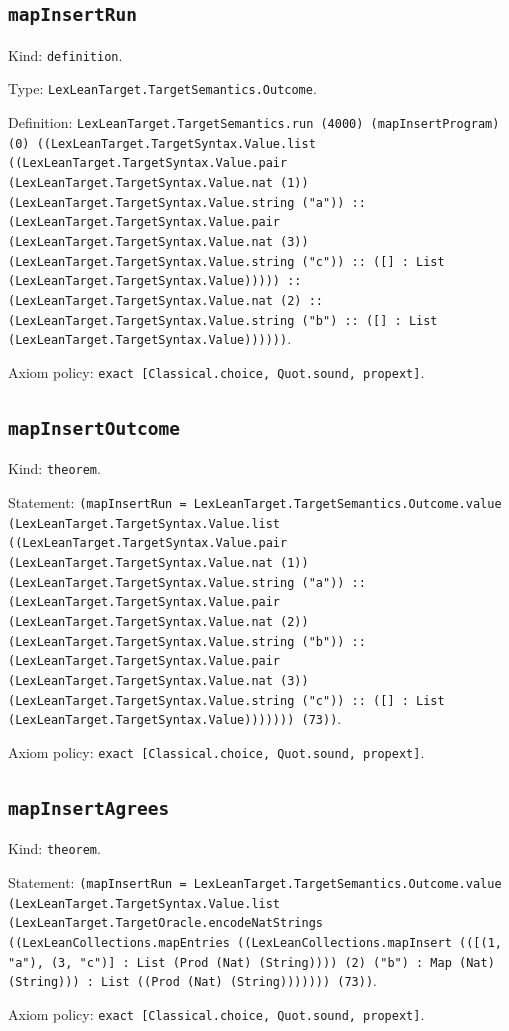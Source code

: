 \documentclass[11pt]{article}
\begin{document}
\subsection*{\texttt{mapInsertRun}}
\noindent Kind: \texttt{definition}.\par
\noindent Type: \texttt{LexLeanTarget.TargetSemantics.Outcome}.\par
\noindent Definition: \texttt{LexLeanTarget.TargetSemantics.run (4000) (mapInsertProgram) (0) ((LexLeanTarget.TargetSyntax.Value.list ((LexLeanTarget.TargetSyntax.Value.pair (LexLeanTarget.TargetSyntax.Value.nat (1)) (LexLeanTarget.TargetSyntax.Value.string ("a")) :: (LexLeanTarget.TargetSyntax.Value.pair (LexLeanTarget.TargetSyntax.Value.nat (3)) (LexLeanTarget.TargetSyntax.Value.string ("c")) :: ([] : List (LexLeanTarget.TargetSyntax.Value))))) :: (LexLeanTarget.TargetSyntax.Value.nat (2) :: (LexLeanTarget.TargetSyntax.Value.string ("b") :: ([] : List (LexLeanTarget.TargetSyntax.Value))))))}.\par
\noindent Axiom policy: \texttt{exact [Classical.choice, Quot.sound, propext]}.\par
\subsection*{\texttt{mapInsertOutcome}}
\noindent Kind: \texttt{theorem}.\par
\noindent Statement: \texttt{(mapInsertRun = LexLeanTarget.TargetSemantics.Outcome.value (LexLeanTarget.TargetSyntax.Value.list ((LexLeanTarget.TargetSyntax.Value.pair (LexLeanTarget.TargetSyntax.Value.nat (1)) (LexLeanTarget.TargetSyntax.Value.string ("a")) :: (LexLeanTarget.TargetSyntax.Value.pair (LexLeanTarget.TargetSyntax.Value.nat (2)) (LexLeanTarget.TargetSyntax.Value.string ("b")) :: (LexLeanTarget.TargetSyntax.Value.pair (LexLeanTarget.TargetSyntax.Value.nat (3)) (LexLeanTarget.TargetSyntax.Value.string ("c")) :: ([] : List (LexLeanTarget.TargetSyntax.Value))))))) (73))}.\par
\noindent Axiom policy: \texttt{exact [Classical.choice, Quot.sound, propext]}.\par
\subsection*{\texttt{mapInsertAgrees}}
\noindent Kind: \texttt{theorem}.\par
\noindent Statement: \texttt{(mapInsertRun = LexLeanTarget.TargetSemantics.Outcome.value (LexLeanTarget.TargetSyntax.Value.list (LexLeanTarget.TargetOracle.encodeNatStrings ((LexLeanCollections.mapEntries ((LexLeanCollections.mapInsert (([(1, "a"), (3, "c")] : List (Prod (Nat) (String)))) (2) ("b") : Map (Nat) (String))) : List ((Prod (Nat) (String))))))) (73))}.\par
\noindent Axiom policy: \texttt{exact [Classical.choice, Quot.sound, propext]}.\par
\end{document}
